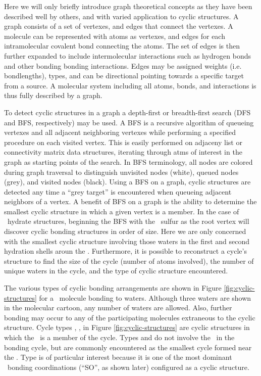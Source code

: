 Here we will only briefly introduce graph theoretical concepts as they have been described well by others, and with varied application to cyclic structures.\cite{Tutte1984, Balakrishnan2000, Harary1973, Huber2007, Garcia2004, Dury2001} A graph consists of a set of vertexes, and edges that connect the vertexes. A molecule can be represented with atoms as vertexes, and edges for each intramolecular covalent bond connecting the atoms. The set of edges is then further expanded to include intermolecular interactions such as hydrogen bonds and other bonding bonding interactions. Edges may be assigned weights (i.e. bondlengths), types, and can be directional pointing towards a specific target from a source. A molecular system including all atoms, bonds, and interactions is thus fully described by a graph. 

To detect cyclic structures in a graph a depth-first or breadth-first search (DFS and BFS, respectively) may be used.\cite{Knuth1997, Cormen 2001} A BFS is a recursive algorithm of queueing vertexes and all adjacent neighboring vertexes while performing a specified procedure on each visited vertex. This is easily performed on adjaceny list or connectivity matrix data structures, iterating through atms of interest in the graph as starting points of the search. In BFS terminology, all nodes are colored during graph traversal to distinguish unvisited nodes (white), queued nodes (grey), and visited nodes (black). Using a BFS on a graph, cyclic structures are detected any time a ``grey target'' is encountered when queueing adjacent neighbors of a vertex. A benefit of BFS on a graph is the ability to determine the smallest cyclic structure in which a given vertex is a member. In the case of \suldiox~hydrate structures, beginning the BFS with the \suldiox~sulfur as the root vertex will discover cyclic bonding structures in order of size. Here we are only concerned with the smallest cyclic structure involving those waters in the first and second hydration shells aroun the \suldiox. Furthermore, it is possible to reconstruct a cycle's structure to find the size of the cycle (number of atoms involved), the number of unique waters in the cycle, and the type of cyclic structure encountered.

The various types of cyclic bonding arrangements are shown in Figure \ref{fig:cyclic-structures} for a \suldiox~molecule bonding to waters. Although three waters are shown in the molecular cartoon, any number of waters are allowed. Also, further bonding may occur to any of the participating molecules extraneous to the cyclic structure. Cycle types , ,  in Figure \ref{fig:cyclic-structures} are cyclic structures in which the \suldiox~is a member of the cycle. Types  and  do not involve the \suldiox~in the bonding cycle, but are commonly encountered as the smallest cycle formed near the \suldiox. Type  is of particular interest because it is one of the most dominant \suldiox~bonding coordinations (``SO'', as shown later) configured as a cyclic structure. 

